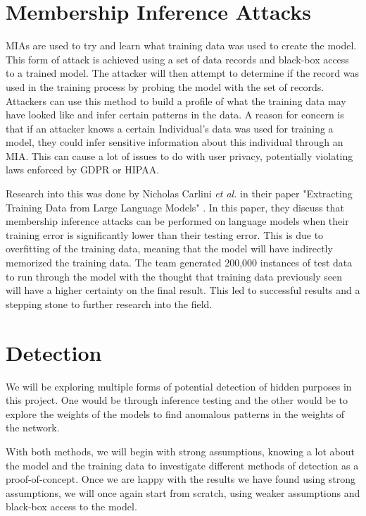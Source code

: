 \section{Membership Inference Attacks}

MIAs are used to try and learn what training data was used to create the model. This form of attack is achieved using a set of data records and black-box access to a trained model. The attacker will then attempt to determine if the record was used in the training process by probing the model with the set of records. Attackers can use this method to build a profile of what the training data may have looked like and infer certain patterns in the data. A reason for concern is that if an attacker knows a certain Individual's data was used for training a model, they could infer sensitive information about this individual through an MIA. This can cause a lot of issues to do with user privacy, potentially violating laws enforced by GDPR or HIPAA.

Research into this was done by Nicholas Carlini \textit{et al.} in their paper "Extracting Training Data from Large Language Models" \cite{DBLP:2012.07805}. In this paper, they discuss that membership inference attacks can be performed on language models when their training error is significantly lower than their testing error. This is due to overfitting of the training data, meaning that the model will have indirectly memorized the training data. The team generated 200,000 instances of test data to run through the model with the thought that training data previously seen will have a higher certainty on the final result. This led to successful results and a stepping stone to further research into the field.

\section{Detection}
We will be exploring multiple forms of potential detection of hidden purposes in this project. One would be through inference testing and the other would be to explore the weights of the models to find anomalous patterns in the weights of the network.

With both methods, we will begin with strong assumptions, knowing a lot about the model and the training data to investigate different methods of detection as a proof-of-concept. Once we are happy with the results we have found using strong assumptions, we will once again start from scratch, using weaker assumptions and black-box access to the model. 

